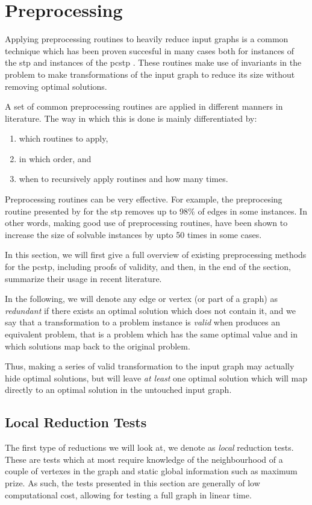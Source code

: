  \section{Preprocessing}
 \label{sec:solving:pre}
Applying preprocessing routines to heavily reduce input graphs is a common technique which has been proven succesful in many cases both for instances of the \gls{stp}
\citep{koch1998solving}
and instances of the \gls{pcstp}
\citep{lucena2004strong,canuto2001local,ljubic2005solving, gamrath2017scip}. %
These routines make use of invariants in the problem to make transformations of the
input graph to reduce its size without removing optimal solutions.

A set of common preprocessing routines are applied in different manners in literature.
The way in which this is done is mainly differentiated by:
\begin{enumerate}[label=\alph*)]
\item which routines to apply,
\item in which order, and
\item when to recursively apply routines and how many times.
\end{enumerate}
Preprocessing routines can be very effective. For example, the preprocesing routine
presented by \citet{koch1998solving} for the \gls{stp} removes
up to 98\% of edges in some instances. In other words, making good use of preprocessing
routines, have been shown to increase the size of solvable instances by upto 50 times in some
cases.

In this section, we will first give a full overview of
existing preprocessing methods for the \gls{pcstp},
 including proofs of validity,
 and then, in the end of the section,
 summarize their usage in recent literature.

 In the following, we will denote any edge or vertex (or part of a graph) as
 \textit{redundant} if there exists an optimal solution
  which does not contain it, and we say that a 
  transformation to a problem instance is \textit{valid} when produces an
  equivalent problem, that is a problem which has the same optimal
  value and in which solutions map back to the original problem.

  Thus, making a series of valid transformation to the input graph may actually
  hide optimal solutions, but will leave \textit{at least} one optimal solution
  which will map directly to an optimal solution in the untouched input graph.
 \subsection{Local Reduction Tests}\label{sec:pre:local}
 The first type of reductions we will look at, we denote as \textit{local} reduction tests.
 These are tests which at most require knowledge
 of the neighbourhood of a couple of vertexes in the graph
 and static global information
 such as maximum prize. As such, the tests
 presented in this section are generally of low computational cost,
 allowing for testing a full graph in linear time.


